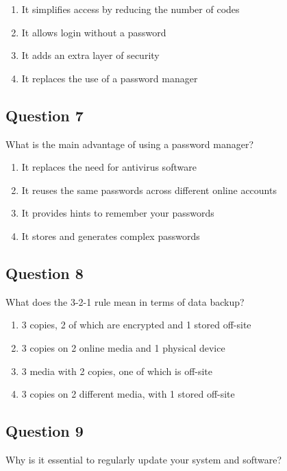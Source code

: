 \documentclass[12pt,a4paper]{article}
\begin{document}
\begin{enumerate}[label=\Alph*., leftmargin=*]
\item It simplifies access by reducing the number of codes
\item It allows login without a password
\item It adds an extra layer of security
\item It replaces the use of a password manager
\end{enumerate}

\bigskip


\subsection*{Question 7}
What is the main advantage of using a password manager?

\begin{enumerate}[label=\Alph*., leftmargin=*]
\item It replaces the need for antivirus software
\item It reuses the same passwords across different online accounts
\item It provides hints to remember your passwords
\item It stores and generates complex passwords
\end{enumerate}

\bigskip


\subsection*{Question 8}
What does the 3-2-1 rule mean in terms of data backup?

\begin{enumerate}[label=\Alph*., leftmargin=*]
\item 3 copies, 2 of which are encrypted and 1 stored off-site
\item 3 copies on 2 online media and 1 physical device
\item 3 media with 2 copies, one of which is off-site
\item 3 copies on 2 different media, with 1 stored off-site
\end{enumerate}

\bigskip


\subsection*{Question 9}
Why is it essential to regularly update your system and software?
\end{document}
